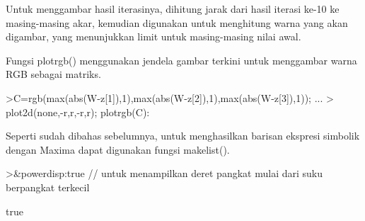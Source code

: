 \documentclass{article}
\begin{document}
\begin{eulernotebook}
\begin{eulercomment}
\begin{eulercomment}
\begin{eulercomment}
\begin{eulercomment}
\begin{eulercomment}
\begin{eulercomment}
\begin{eulercomment}
\begin{eulercomment}
\begin{eulercomment}
\begin{eulercomment}
\begin{eulercomment}
Untuk menggambar hasil iterasinya, dihitung jarak dari hasil iterasi
ke-10 ke masing-masing akar, kemudian digunakan untuk menghitung warna
yang akan digambar, yang menunjukkan limit untuk masing-masing nilai
awal.

Fungsi plotrgb() menggunakan jendela gambar terkini untuk menggambar
warna RGB sebagai matriks.
\end{eulercomment}
\begin{eulerprompt}
>C=rgb(max(abs(W-z[1]),1),max(abs(W-z[2]),1),max(abs(W-z[3]),1)); ...
>  plot2d(none,-r,r,-r,r); plotrgb(C):
\end{eulerprompt}
\begin{eulercomment}
Seperti sudah dibahas sebelumnya, untuk menghasilkan barisan ekspresi
simbolik dengan Maxima dapat digunakan fungsi makelist().
\end{eulercomment}
\begin{eulerprompt}
>&powerdisp:true // untuk menampilkan deret pangkat mulai dari suku berpangkat terkecil
\end{eulerprompt}
\begin{euleroutput}
  
                                   true
  

\end{euleroutput}
\end{eulercomment}
\end{eulercomment}
\end{eulercomment}
\end{eulercomment}
\end{eulercomment}
\end{eulercomment}
\end{eulercomment}
\end{eulercomment}
\end{eulercomment}
\end{eulercomment}
\end{eulernotebook}
\end{document}

